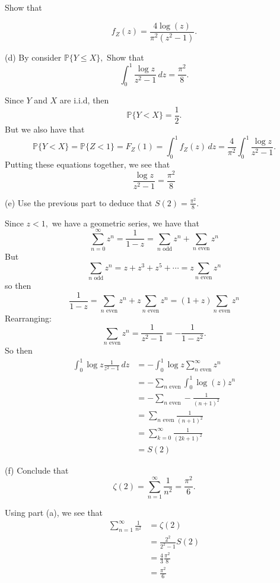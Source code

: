 \documentclass[11pt]{article}
\newcommand{\bbP}{\mathbb{P}}
\begin{document}
Show that

\[
f_Z(z) = \frac{4 \log(z)}{\pi^2 (z^2 - 1)}.
\]

(d) By consider $\bbP\{Y \leq X\},$ Show that
\[
\int_0^1 \frac{\log z}{z^2 - 1} \, dz = \frac{\pi^2}{8}.
\]
\begin{solution}
    Since $Y$ and $X$ are i.i.d, then 
    \[\bbP\{Y < X\} = \frac{1}{2}.\] But we also have that
\[\bbP\{Y < X\} = \bbP\{Z < 1\} = F_Z(1) = \int_0^1 f_Z(z)\,dz = \frac{4}{\pi^2}\int_0^1 \frac{\log z}{z^2- 1}.\] Putting these equations together, we see that 
\[\frac{\log z}{z^2- 1}=  \frac{\pi^2}{8}\]
\end{solution}

(e) Use the previous part to deduce that \(S(2) = \frac{\pi^2}{8}\).
\begin{solution}
Since $z <1,$ we have a geometric series, we have that 
\[\sum_{n=0}^\infty z^n = \frac{1}{1-z} = \sum_{n \text{ odd}}z^n + \sum_{n \text{ even}}z^n\] But 
\[\sum_{n \text{ odd}}z^n= z + z^3 + z^5 +\cdots = z\sum_{n \text{ even}}z^n\] so then 
\[\frac{1}{1-z} =\sum_{n \text{ even}}z^n +  z\sum_{n \text{ even}}z^n = (1 + z)\sum_{n \text{ even}}z^n \] Rearranging:
\[\sum_{n \text{ even}}z^n = \frac{1}{z^2 -1} = -\frac{1}{1-z^2}.\] So then
\begin{align*}
    \int_0^1 \log z \frac{1}{z^2 -1} \,dz &= -\int_0^1 \log z\sum_{n \text{ even}}^\infty z^n\\
    &= -\sum_{n \text{ even}} \int_0^1\log (z) z^n\\
    &= -\sum_{n \text{ even}} -\frac{1}{(n+1)^2}\\
    &= \sum_{n \text{ even}} \frac{1}{(n+1)^2}\\
    &= \sum_{k=0}^\infty \frac{1}{(2k+1)^2}\\
    &= S(2)
\end{align*}

\end{solution}

(f) Conclude that
\[
\zeta(2) = \sum_{n=1}^\infty \frac{1}{n^2} = \frac{\pi^2}{6}.
\]
\begin{solution}
   Using part (a), we see that 
\begin{align*}
\sum_{n=1}^\infty \frac{1}{n^2} &= \zeta(2)\\
    &= \frac{2^2}{2^2-1}S(2)\\
    &= \frac{4}{3}\frac{\pi^2}{8}\\
    &= \frac{\pi^2}{6}
\end{align*}
\end{solution}
\end{document}
